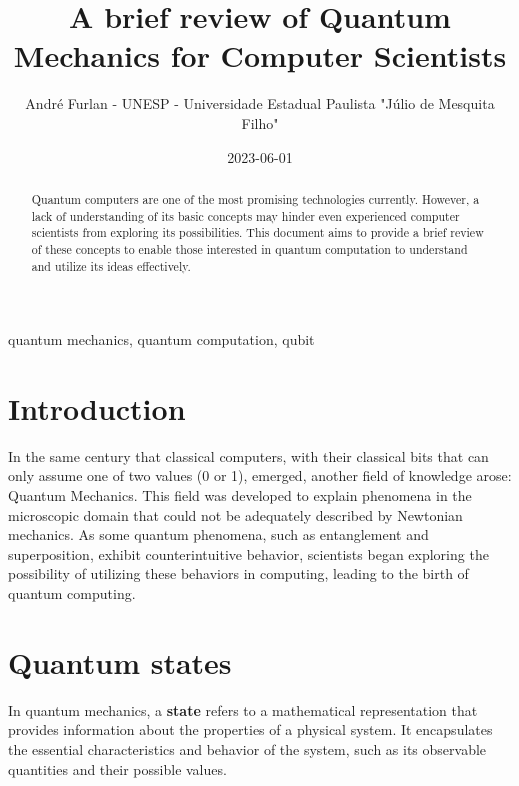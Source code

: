 


	\title{A brief review of Quantum Mechanics for Computer Scientists}
	\author{André Furlan - UNESP - Universidade Estadual Paulista "Júlio de Mesquita Filho"}
	\date{2023-06-01}
	\maketitle
	
	\begin{abstract}
		Quantum computers are one of the most promising technologies currently. However, a lack of understanding of its basic concepts may hinder even experienced computer scientists from exploring its possibilities. This document aims to provide a brief review of these concepts to enable those interested in quantum computation to understand and utilize its ideas effectively.
	\end{abstract}
	
	\begin{IEEEkeywords}
		quantum mechanics, quantum computation, qubit
	\end{IEEEkeywords}
	
	\section{Introduction}
		\par In the same century that classical computers, with their classical bits that can only assume one of two values (0 or 1), emerged, another field of knowledge arose: Quantum Mechanics. This field was developed to explain phenomena in the microscopic domain that could not be adequately described by Newtonian mechanics. As some quantum phenomena, such as entanglement and superposition, exhibit counterintuitive behavior, scientists began exploring the possibility of utilizing these behaviors in computing, leading to the birth of quantum computing.
		
	\section{Quantum states}
		\par In quantum mechanics, a \textbf{state} refers to a mathematical representation that provides information about the properties of a physical system. It encapsulates the essential characteristics and behavior of the system, such as its observable quantities and their possible values.\newline
		

